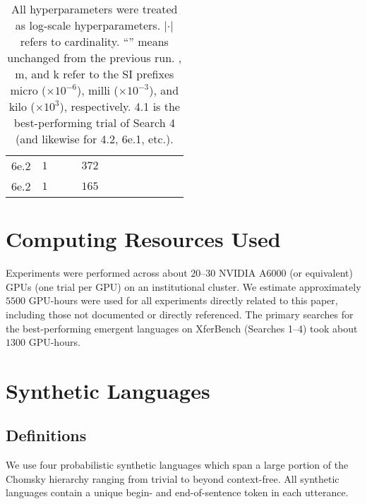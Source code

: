 \begin{table*}
\begin{tabular}{lrrrrrrrrrrr}
    6e.2 & $1$   & \dit{}   &   \dit{} & $372$      & \dit{}      & \dit{}     & \dit{}     & \dit{}                           & \dit{}             & \dit{}   & \dit{}            \\
    6e.2 & $1$   & \dit{}   &   \dit{} & $165$      & \dit{}      & \dit{}     & \dit{}     & \dit{}                           & \dit{}             & \dit{}   & \dit{}            \\
    \bottomrule
  \end{tabular}
  \caption{All hyperparameters were treated as log-scale hyperparameters. $|{\cdot}|$ refers to cardinality. ``\dit{}'' means unchanged from the previous run. \textmu, m, and k refer to the SI prefixes micro ($\times10^{-6}$), milli ($\times10^{-3}$), and kilo ($\times10^{3}$), respectively.  4.1 is the best-performing trial of Search 4 (and likewise for 4.2, 6e.1, etc.).}
  \unskip\label{tab:hp-search-all}
\end{table*}

\section{Computing Resources Used}
\unskip\label{hpo:sec:resources}
Experiments were performed across about $20$--$30$ NVIDIA A6000 (or equivalent) GPUs (one trial per GPU) on an institutional cluster.
We estimate approximately $5500$ GPU-hours were used for all experiments directly related to this paper, including those not documented or directly referenced.
The primary searches for the best-performing emergent languages on XferBench (Searches 1--4) took about $1300$ GPU-hours.


\section{Synthetic Languages}
\unskip\label{hpo:sec:synth}
\subsection{Definitions}
We use four probabilistic synthetic languages which span a large portion of the Chomsky hierarchy ranging from trivial to beyond context-free.
All synthetic languages contain a unique begin- and end-of-sentence token in each utterance.


